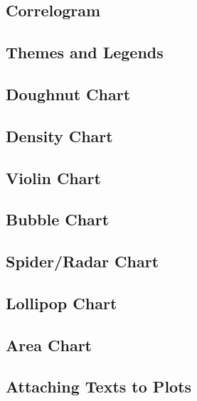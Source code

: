 \documentclass[
]{book}
\begin{document}
\hypertarget{correlogram}{%
\subsection{Correlogram}\label{correlogram}}

\hypertarget{themes-and-legends}{%
\subsection{Themes and Legends}\label{themes-and-legends}}

\hypertarget{doughnut-chart}{%
\subsection{Doughnut Chart}\label{doughnut-chart}}

\hypertarget{density-chart}{%
\subsection{Density Chart}\label{density-chart}}

\hypertarget{violin-chart}{%
\subsection{Violin Chart}\label{violin-chart}}

\hypertarget{bubble-chart}{%
\subsection{Bubble Chart}\label{bubble-chart}}

\hypertarget{spiderradar-chart}{%
\subsection{Spider/Radar Chart}\label{spiderradar-chart}}

\hypertarget{lollipop-chart}{%
\subsection{Lollipop Chart}\label{lollipop-chart}}

\hypertarget{area-chart}{%
\subsection{Area Chart}\label{area-chart}}

\hypertarget{attaching-texts-to-plots}{%
\subsection{Attaching Texts to Plots}\label{attaching-texts-to-plots}}
\end{document}
